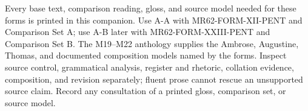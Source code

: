   Every base text, comparison reading, gloss, and source model needed for these
  forms is printed in this companion. Use A-A with MR62-FORM-XII-PENT and
  Comparison Set A; use A-B later with MR62-FORM-XXIII-PENT and Comparison Set
  B. The M19--M22 anthology supplies the Ambrose, Augustine, Thomas, and
  documented composition models named by the forms. Inspect source control,
  grammatical analysis, register and rhetoric, collation evidence,
  composition, and revision separately; fluent prose cannot rescue an
  unsupported source claim. Record any consultation of a printed gloss,
  comparison set, or source model.


